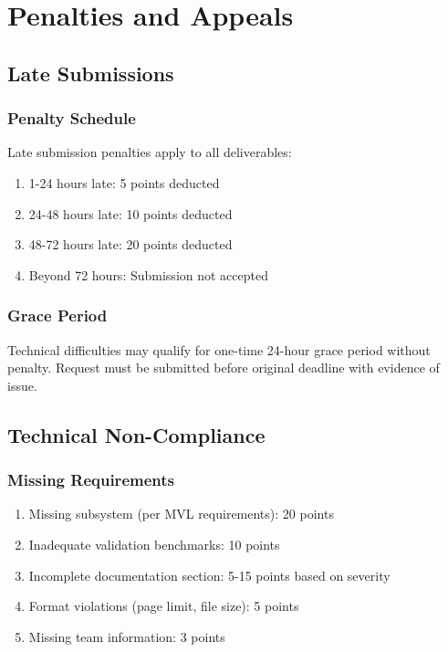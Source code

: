 
\renewcommand{\thesection}{PA}
\section{Penalties and Appeals}

\subsection{Late Submissions}

\subsubsection{Penalty Schedule}
Late submission penalties apply to all deliverables:
\begin{enumerate}[noitemsep]
    \item 1-24 hours late: 5 points deducted
    \item 24-48 hours late: 10 points deducted
    \item 48-72 hours late: 20 points deducted
    \item Beyond 72 hours: Submission not accepted
\end{enumerate}

\subsubsection{Grace Period}
Technical difficulties may qualify for one-time 24-hour grace period without penalty. Request must be submitted before original deadline with evidence of issue.

\subsection{Technical Non-Compliance}

\subsubsection{Missing Requirements}
\begin{enumerate}[noitemsep]
    \item Missing subsystem (per MVL requirements): 20 points
    \item Inadequate validation benchmarks: 10 points
    \item Incomplete documentation section: 5-15 points based on severity
    \item Format violations (page limit, file size): 5 points
    \item Missing team information: 3 points
\end{enumerate}

